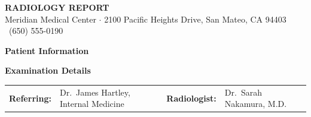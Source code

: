 \documentclass[11pt]{article}
\begin{document}
\begin{headerbar}
  {\LARGE\bfseries\sffamily RADIOLOGY REPORT} \\[2pt]
  {\small\sffamily Meridian Medical Center $\cdot$ 2100 Pacific Heights Drive, San Mateo, CA 94403
  \hfill \faPhone\ (650) 555-0190}
\end{headerbar}

\vspace{10pt}

\begin{infobox}
  \begin{minipage}[t]{0.48\textwidth}
    \raggedright
    {\sffamily\bfseries\color{primaryblue} Patient Information} \\[4pt]
  \end{minipage}
  \hfill
  \begin{minipage}[t]{0.48\textwidth}
    \raggedright
    {\sffamily\bfseries\color{primaryblue} Examination Details} \\[4pt]
  \end{minipage}
  \par
  \vspace{2pt}
  \begin{tabular}{@{}p{0.95in} p{2.0in} p{0.9in} p{1.9in}@{}}
    \textbf{Referring:} & Dr.\ James Hartley, Internal Medicine &
    \textbf{Radiologist:} & Dr.\ Sarah Nakamura, M.D. \\
  \end{tabular}
\end{infobox}

\vspace{10pt}







\end{document}
